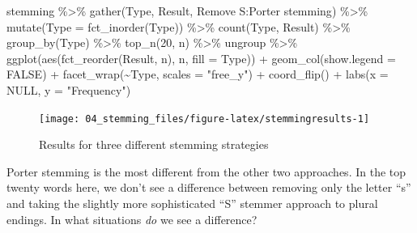\documentclass[
]{krantz}
\makeatletter
\newenvironment{Shaded}{\begin{snugshade}}{\end{snugshade}}
\newcommand{\AttributeTok}[1]{\textcolor[rgb]{0.77,0.63,0.00}{#1}}
\newcommand{\ConstantTok}[1]{\textcolor[rgb]{0.00,0.00,0.00}{#1}}
\newcommand{\DecValTok}[1]{\textcolor[rgb]{0.00,0.00,0.81}{#1}}
\newcommand{\FunctionTok}[1]{\textcolor[rgb]{0.00,0.00,0.00}{#1}}
\newcommand{\NormalTok}[1]{#1}
\newcommand{\SpecialCharTok}[1]{\textcolor[rgb]{0.00,0.00,0.00}{#1}}
\newcommand{\StringTok}[1]{\textcolor[rgb]{0.31,0.60,0.02}{#1}}
\newenvironment{kframe}{%
\medskip{}
\setlength{\fboxsep}{.8em}
 \def\at@end@of@kframe{}%
 \ifinner\ifhmode%
  \def\at@end@of@kframe{\end{minipage}}%
  \begin{minipage}{\columnwidth}%
 \fi\fi%
 \def\FrameCommand##1{\hskip\@totalleftmargin \hskip-\fboxsep
 \colorbox{shadecolor}{##1}\hskip-\fboxsep
     \hskip-\linewidth \hskip-\@totalleftmargin \hskip\columnwidth}%
 \MakeFramed {\advance\hsize-\width
   \@totalleftmargin\z@ \linewidth\hsize
   \@setminipage}}%
 {\par\unskip\endMakeFramed%
 \at@end@of@kframe}
\renewenvironment{Shaded}{\begin{kframe}}{\end{kframe}}
\makeatother
\begin{document}
\begin{Shaded}
\begin{Highlighting}[]
\NormalTok{stemming }\SpecialCharTok{\%\textgreater{}\%}
  \FunctionTok{gather}\NormalTok{(Type, Result, }\StringTok{\textasciigrave{}}\AttributeTok{Remove S}\StringTok{\textasciigrave{}}\SpecialCharTok{:}\StringTok{\textasciigrave{}}\AttributeTok{Porter stemming}\StringTok{\textasciigrave{}}\NormalTok{) }\SpecialCharTok{\%\textgreater{}\%}
  \FunctionTok{mutate}\NormalTok{(}\AttributeTok{Type =} \FunctionTok{fct\_inorder}\NormalTok{(Type)) }\SpecialCharTok{\%\textgreater{}\%}
  \FunctionTok{count}\NormalTok{(Type, Result) }\SpecialCharTok{\%\textgreater{}\%}
  \FunctionTok{group\_by}\NormalTok{(Type) }\SpecialCharTok{\%\textgreater{}\%}
  \FunctionTok{top\_n}\NormalTok{(}\DecValTok{20}\NormalTok{, n) }\SpecialCharTok{\%\textgreater{}\%}
\NormalTok{  ungroup }\SpecialCharTok{\%\textgreater{}\%}
  \FunctionTok{ggplot}\NormalTok{(}\FunctionTok{aes}\NormalTok{(}\FunctionTok{fct\_reorder}\NormalTok{(Result, n),}
\NormalTok{             n, }\AttributeTok{fill =}\NormalTok{ Type)) }\SpecialCharTok{+}
  \FunctionTok{geom\_col}\NormalTok{(}\AttributeTok{show.legend =} \ConstantTok{FALSE}\NormalTok{) }\SpecialCharTok{+}
  \FunctionTok{facet\_wrap}\NormalTok{(}\SpecialCharTok{\textasciitilde{}}\NormalTok{Type, }\AttributeTok{scales =} \StringTok{"free\_y"}\NormalTok{) }\SpecialCharTok{+}
  \FunctionTok{coord\_flip}\NormalTok{() }\SpecialCharTok{+}
  \FunctionTok{labs}\NormalTok{(}\AttributeTok{x =} \ConstantTok{NULL}\NormalTok{, }\AttributeTok{y =} \StringTok{"Frequency"}\NormalTok{)}
\end{Highlighting}
\end{Shaded}

\begin{figure}

{\centering \texttt{[image: 04\_stemming\_files/figure-latex/stemmingresults-1]} 

}

\caption{Results for three different stemming strategies}\label{fig:stemmingresults}
\end{figure}

Porter stemming is the most different from the other two approaches. In the top twenty words here, we don't see a difference between removing only the letter ``s'' and taking the slightly more sophisticated ``S'' stemmer approach to plural endings. In what situations \emph{do} we see a difference?
\end{document}
